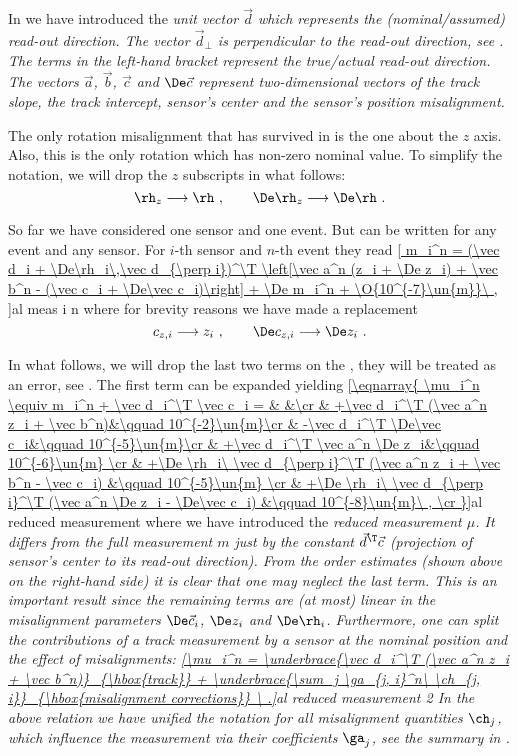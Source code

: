 In  we have introduced the \em{unit} vector $\vec d$ which represents the (nominal/assumed) \em{read-out direction}. The vector $\vec d_\perp$ is perpendicular to the read-out direction, see . The terms in the left-hand bracket represent the true/actual read-out direction. The vectors $\vec a$, $\vec b$, $\vec c$ and $\De \vec c$ represent two-dimensional vectors of the track slope, the track intercept, sensor's center and the sensor's position misalignment.

The only rotation misalignment that has survived in  is the one about the $z$ axis. Also, this is the only rotation which has non-zero nominal value. To simplify the notation, we will drop the $z$ subscripts in what follows:
$$\rh_z \longrightarrow \rh\ ,\qquad \De\rh_z \longrightarrow \De\rh\ .$$

So far we have considered one sensor and one event. But  can be written for any event and any sensor. For $i$-th sensor and $n$-th event they read
\eqref{
m_i^n = (\vec d_i + \De\rh_i\,\vec d_{\perp i})^\T \left[\vec a^n (z_i + \De z_i) + \vec b^n - (\vec c_i + \De\vec c_i)\right] + \De m_i^n + \O{10^{-7}\un{m}}\ ,
}{al meas i n}
where for brevity reasons we have made a replacement
$$c_{z,i} \longrightarrow z_i\ ,\qquad \De c_{z,i} \longrightarrow \De z_i\ .$$

In what follows, we will drop the last two terms on the \rhs, they will be treated as an error, see . The first term can be expanded yielding
\eqref{\eqnarray{
\mu_i^n \equiv m_i^n + \vec d_i^\T \vec c_i = & &\cr
& +\vec d_i^\T (\vec a^n z_i + \vec b^n)&\qquad 10^{-2}\un{m}\cr
& -\vec d_i^\T \De\vec c_i&\qquad 10^{-5}\un{m}\cr
& +\vec d_i^\T \vec a^n \De z_i&\qquad 10^{-6}\un{m} \cr
& +\De \rh_i\ \vec d_{\perp i}^\T (\vec a^n z_i + \vec b^n - \vec c_i) &\qquad 10^{-5}\un{m} \cr
& +\De \rh_i\ \vec d_{\perp i}^\T (\vec a^n \De z_i - \De\vec c_i) &\qquad 10^{-8}\un{m}\ , \cr
}}{al reduced measurement}
where we have introduced the \em{reduced measurement} $\mu$. It differs from the full measurement $m$ just by the constant $\vec d^\T \vec c$ (projection of sensor's center to its read-out direction). From the order estimates (shown above on the right-hand side) it is clear that one may neglect the last term. This is an important result since the remaining terms are (at most) linear in the misalignment parameters $\De \vec c_i$, $\De z_i$ and $\De \rh_i$. Furthermore, one can split the contributions of a track measurement by a sensor at the nominal position and the effect of misalignments:
\eqref{\mu_i^n =
\underbrace{\vec d_i^\T (\vec a^n z_i + \vec b^n)}_{\hbox{track}}
+
\underbrace{\sum_j \ga_{j, i}^n\ \ch_{j, i}}_{\hbox{misalignment corrections}}
\ .}{al reduced measurement 2}
In the above relation we have unified the notation for all misalignment quantities $\ch_j$, which influence the measurement via their coefficients $\ga_j$, see the summary in .

